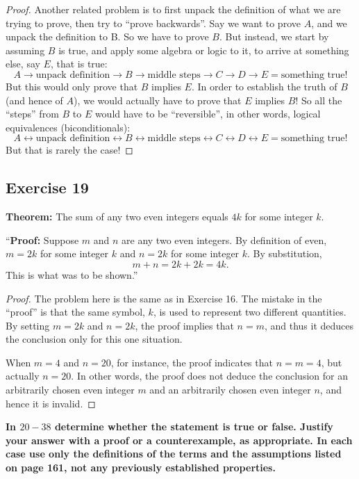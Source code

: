 \documentclass[14pt]{extarticle}
\newcommand{\bic}{\leftrightarrow}
\newcommand{\cy}{\color{cyan}}
\begin{document}
\begin{proof}
    Another related problem is to first unpack the definition of what we are trying to prove, then try to ``prove backwards''. Say we want to prove $A$, and we unpack the definition to B. So we have to prove $B$. But instead, we start by assuming $B$ is true, and apply some algebra or logic to it, to arrive at something else, say $E$, that is true:
    \[
        A \to \text{unpack definition} \to B \to \text{middle steps} \to C \to D \to E = \text{something true!}
    \]
    But this would only prove that $B$ implies $E$. In order to establish the truth of $B$ (and hence of $A$), we would actually have to prove that $E$ implies $B$! So all the ``steps'' from $B$ to $E$ would have to be ``reversible'', in other words, logical equivalences (biconditionals):
    \[
        A \bic \text{unpack definition} \bic B \bic \text{middle steps} \bic C \bic D \bic E = \text{something true!}
    \]
    But that is rarely the case!
\end{proof}

\subsection{Exercise 19}
{\bf Theorem:} The sum of any two even integers equals $4k$ for some integer $k$.

“{\bf Proof:} Suppose $m$ and $n$ are any two even integers. By definition of even, $m = 2k$ for some integer $k$ and $n = 2k$ for some integer $k$. By substitution,
\[
    m + n = 2k + 2k = 4k.
\]
This is what was to be shown.”

\begin{proof}
    The problem here is the same as in Exercise 16. The mistake in the “proof” is that the same symbol, $k$, is used to represent two different quantities. By setting $m = 2k$ and $n = 2k$, the proof implies that $n = m$, and thus it deduces the conclusion only for this one situation.

    When $m = 4$ and $n = 20$, for instance, the proof indicates that $n = m = 4$, but actually $n = 20$. In other words, the proof does not deduce the conclusion for an arbitrarily chosen even integer $m$ and an arbitrarily chosen even integer $n$, and hence it is invalid.
\end{proof}

{\bf \cy In $20-38$ determine whether the statement is true or false. Justify your answer with a proof or a counterexample, as appropriate. In each case use only the definitions of the terms and the assumptions listed on page 161, not any previously established properties.}
\end{document}
